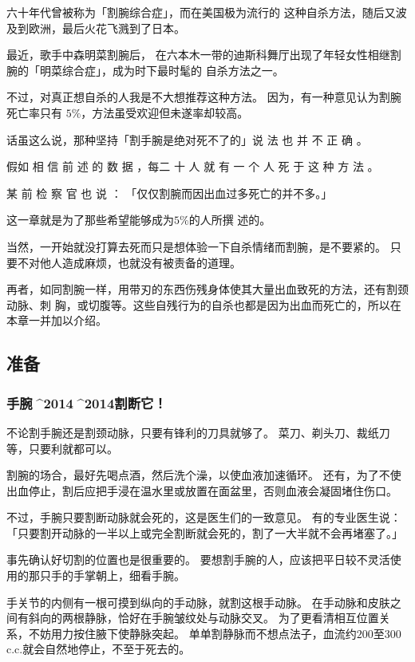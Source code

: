 \documentclass[UTF8]{ctexart}
\begin{document}
六十年代曾被称为「割腕综合症」，而在美国极为流行的
这种自杀方法，随后又波及到欧洲，最后火花飞溅到了日本。

最近，歌手中森明菜割腕后， 在六本木一带的迪斯科舞厅出现了年轻女性相继割腕的「明菜综合症」，成为时下最时髦的 自杀方法之一。

不过，对真正想自杀的人我是不大想推荐这种方法。
因为，有一种意见认为割腕死亡率只有 $5\%$，方法虽受欢迎但未遂率却较高。

话虽这么说，那种坚持「割手腕是绝对死不了的」说 法 也 并 不 正 确 。

假如 相 信 前 述 的 数 据 ，每二 十 人 就 有 一 个 人 死 于 这 种 方 法 。

某 前 检 察 官 也 说 ： 「仅仅割腕而因出血过多死亡的并不多。」

这一章就是为了那些希望能够成为$5\%$的人所撰 述的。

当然，一开始就没打算去死而只是想体验一下自杀情绪而割腕，是不要紧的。
只要不对他人造成麻烦，也就没有被责备的道理。

再者，如同割腕一样，用带刃的东西伤残身体使其大量出血致死的方法，还有割颈动脉、刺
胸，或切腹等。这些自残行为的自杀也都是因为出血而死亡的，所以在本章一并加以介绍。

\subsection{准备}

\subsubsection{手腕^^^^2014^^^^2014割断它！}

不论割手腕还是割颈动脉，只要有锋利的刀具就够了。
菜刀、剃头刀、裁纸刀等，只要利就都可以。

割腕的场合，最好先喝点酒，然后洗个澡，以使血液加速循环。
还有，为了不使出血停止，割后应把手浸在温水里或放置在面盆里，否则血液会凝固堵住伤口。

不过，手腕只要割断动脉就会死的，这是医生们的一致意见。
有的专业医生说：「只要割开动脉的一半以上或完全割断就会死的，割了一大半就不会再堵塞了。」

事先确认好切割的位置也是很重要的。
要想割手腕的人，应该把平日较不灵活使用的那只手的手掌朝上，细看手腕。

手关节的内侧有一根可摸到纵向的手动脉，就割这根手动脉。
在手动脉和皮肤之间有斜向的两根静脉，恰好在手腕皱纹处与动脉交叉。
为了更看清相互位置关系，不妨用力按住腋下使静脉突起。
单单割静脉而不想点法子，血流约$200$至$300$c.c.就会自然地停止，不至于死去的。
\end{document}
